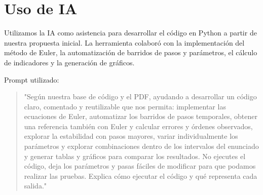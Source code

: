 \section{Uso de IA}

Utilizamos la IA como asistencia para desarrollar el código en Python a partir de nuestra propuesta inicial. La herramienta colaboró con la implementación del método de Euler, la automatización de barridos de pasos y parámetros, el cálculo de indicadores y la generación de gráficos.

Prompt utilizado: 

\begin{quote}
"Según nuestra base de código y el PDF, ayudando a desarrollar un código claro, comentado y reutilizable que nos permita: implementar las ecuaciones de Euler, automatizar los barridos de pasos temporales, obtener una referencia también con Euler y calcular errores y órdenes observados, explorar la estabilidad con pasos mayores, variar individualmente los parámetros y explorar combinaciones dentro de los intervalos del enunciado y generar tablas y gráficos para comparar los resultados.  
No ejecutes el código, deja los parámetros y pasas fáciles de modificar para que podamos realizar las pruebas. Explica cómo ejecutar el código y qué representa cada salida."
\end{quote}
